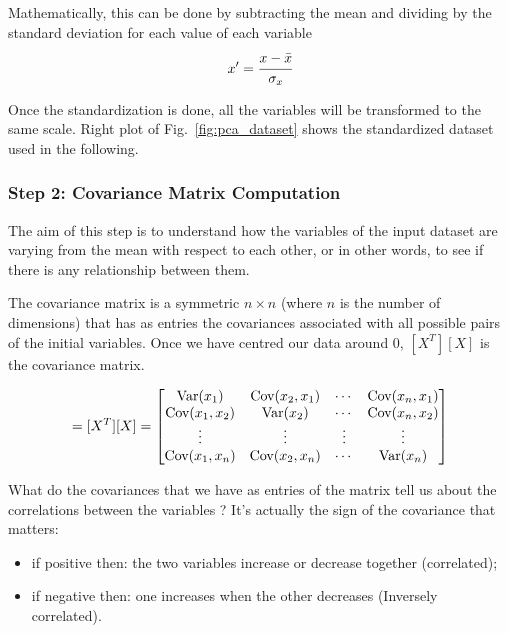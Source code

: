 Mathematically, this can be done by subtracting the mean and dividing by the standard deviation for each value of each variable
\begin{equation*}
x' = \cfrac{x-\bar{x}}{\sigma_x}
\end{equation*}

Once the standardization is done, all the variables will be transformed to the same scale. Right plot of Fig.~\ref{fig:pca_dataset} shows the standardized dataset used in the following.

\subsubsection*{Step 2: Covariance Matrix Computation}

The aim of this step is to understand how the variables of the input dataset are varying from the mean with respect to each other, or in other words, to see if there is any relationship between them. 

The covariance matrix is a symmetric $n\times n$ (where $n$ is the number of dimensions) that has as entries the covariances associated with all possible pairs of the initial variables. %
Once we have centred our data around 0, $[X^T][X]$ is the covariance matrix.

\begin{equation}
	[\Sigma]=[X^T][X] =
	\begin{bmatrix}
		\var(x_1) & \cov(x_2, x_1) & \cdots & \cov(x_n, x_1) \\
		\cov(x_1, x_2) & \var(x_2) & \cdots & \cov(x_n, x_2) \\
		\vdots & \vdots & \vdots & \vdots \\
		\cov(x_1, x_n) & \cov(x_2, x_n) & \cdots & \var(x_n)
	\end{bmatrix}
\end{equation}

What do the covariances that we have as entries of the matrix tell us about the correlations between the variables ?
It’s actually the sign of the covariance that matters:
\begin{itemize}
	\item if positive then: the two variables increase or decrease together (correlated);
	\item if negative then: one increases when the other decreases (Inversely correlated).
\end{itemize}

